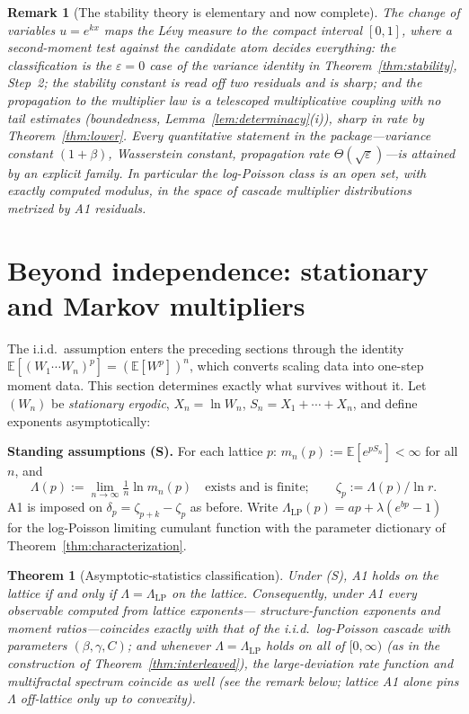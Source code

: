 \documentclass[pdflatex,sn-mathphys-num]{sn-jnl}
\theoremstyle{thmstyleone}
\newtheorem{theorem}{Theorem}
\theoremstyle{thmstyletwo}
\newtheorem*{remark}{Remark}
\theoremstyle{thmstylethree}
\begin{document}
\begin{remark}[The stability theory is elementary and now
complete]
The change of variables $u = e^{kx}$ maps the L\'evy measure to the
compact interval $[0,1]$, where a second-moment test against the
candidate atom decides everything: the classification is the
$\varepsilon = 0$ case of the variance identity in
Theorem~\ref{thm:stability}, Step~2; the stability constant is read
off two residuals and is sharp; and the propagation to the
multiplier law is a telescoped multiplicative coupling with no tail
estimates (boundedness, Lemma~\ref{lem:determinacy}(i)), sharp in
rate by Theorem~\ref{thm:lower}.  Every quantitative statement in
the package---variance constant $(1+\beta)$, Wasserstein constant,
propagation rate $\Theta(\sqrt\varepsilon)$---is attained by an
explicit family.  In particular the log-Poisson class is an open
set, with exactly computed modulus, in the space of cascade
multiplier distributions metrized by A1 residuals.
\end{remark}


\section{Beyond independence: stationary and Markov multipliers}
\label{sec:beyond}

The i.i.d.\ assumption enters the preceding sections through the
identity $\mathbb{E}[(W_1\cdots W_n)^p] = (\mathbb{E}[W^p])^n$,
which converts scaling data into one-step moment data.  This section
determines exactly what survives without it.  Let $(W_n)$ be
\emph{stationary ergodic}, $X_n = \ln W_n$, $S_n = X_1 + \cdots +
X_n$, and define exponents asymptotically:

\smallskip
\noindent\textbf{Standing assumptions (S).}  For each lattice $p$:
$m_n(p) := \mathbb{E}[e^{pS_n}] < \infty$ for all $n$, and
\[
  \Lambda(p) := \lim_{n\to\infty}\tfrac1n\ln m_n(p)
  \quad\text{exists and is finite};
  \qquad \zeta_p := \Lambda(p)/\ln r .
\]
A1 is imposed on $\delta_p = \zeta_{p+k}-\zeta_p$ as before.  Write
$\Lambda_{\mathrm{LP}}(p) = ap + \lambda(e^{bp}-1)$ for the
log-Poisson limiting cumulant function with the parameter dictionary
of Theorem~\ref{thm:characterization}.

\begin{theorem}[Asymptotic-statistics classification]\label{thm:cgflevel}
Under \textup{(S)}, A1 holds on the lattice if and only if
$\Lambda = \Lambda_{\mathrm{LP}}$ on the lattice.  Consequently,
under A1 every observable computed from lattice exponents---%
structure-function exponents and moment ratios---coincides exactly
with that of the i.i.d.\ log-Poisson cascade with parameters
$(\beta, \gamma, C)$; and whenever $\Lambda = \Lambda_{\mathrm{LP}}$
holds on all of $[0,\infty)$ (as in the construction of
Theorem~\ref{thm:interleaved}), the large-deviation rate function
and multifractal spectrum coincide as well (see the remark below;
lattice A1 alone pins $\Lambda$ off-lattice only up to convexity).
\end{theorem}
\end{document}
